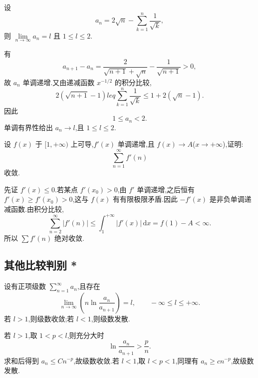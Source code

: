 \begin{example}
    设
    \[
        a_n=2\sqrt n-\sum\limits_{k=1}^n\dfrac{1}{\sqrt k},
    \]
    则 $\displaystyle\lim\limits_{n\to\infty}a_n=l$ 且 $1\leq l\leq2$.
\end{example}
\exampleblank

\begin{solution}
    有
    \[
        a_{n+1}-a_n
        =\dfrac{2}{\sqrt{n+1}+\sqrt n}-\dfrac{1}{\sqrt{n+1}}>0,
    \]
    故 $a_n$ 单调递增.又由递减函数 $x^{-1/2}$ 的积分比较,
    \[
        2(\sqrt{n+1}-1)leq\sum\limits_{k=1}^{n}\dfrac{1}{\sqrt k}
        \leq1+2(\sqrt n-1).
    \]
    因此
    \[
        1\leq a_n<2.
    \]
    单调有界性给出 $a_n\to l$,且 $1\leq l\leq2$.
\end{solution}

\begin{example}
    设 $f(x)$ 于 $\lbrack 1,+\infty)$ 上可导,$f'(x)$ 单调递增,且 $f(x)\to A$($x\to+\infty$),证明:
    \[
        \displaystyle\sum\limits_{n=1}^{\infty}f'(n)
    \]
    收敛.
\end{example}
\exampleblank

\begin{solution}
    先证 $f'(x)\leq0$.若某点 $f'(x_0)>0$,由 $f'$ 单调递增,之后恒有
    $f'(x)\geq f'(x_0)>0$,这与 $f(x)$ 有有限极限矛盾.因此 $-f'(x)$ 是非负单调递减函数.由积分比较,
    \[
        \displaystyle\sum\limits_{n=2}^{\infty}|f'(n)|
        \leq\int_1^{+\infty}|f'(x)|\,\mathrm{d}x
        =f(1)-A<\infty.
    \]
    所以 $\displaystyle \sum f'(n)$ 绝对收敛.
\end{solution}



\subsection{其他比较判别 *}

\begin{example}[比值对数判别法]
    设有正项级数 $\displaystyle\sum\limits_{n=1}^{\infty}a_n$,且存在
    \[
        \displaystyle\lim\limits_{n\to\infty}\left(n\ln\dfrac{a_n}{a_{n+1}}\right)=l,
        \qquad -\infty\leq l\leq+\infty.
    \]
    若 $l>1$,则级数收敛;若 $l<1$,则级数发散.
\end{example}
\exampleblank

\begin{solution}
    若 $l>1$,取 $1<p<l$,则充分大时
    \[
        \ln\dfrac{a_n}{a_{n+1}}>\dfrac{p}{n}.
    \]
    求和后得到 $a_n\leq Cn^{-p}$,故级数收敛.若 $l<1$,取
    $l<p<1$,同理有 $a_n\geq cn^{-p}$,故级数发散.
\end{solution}

